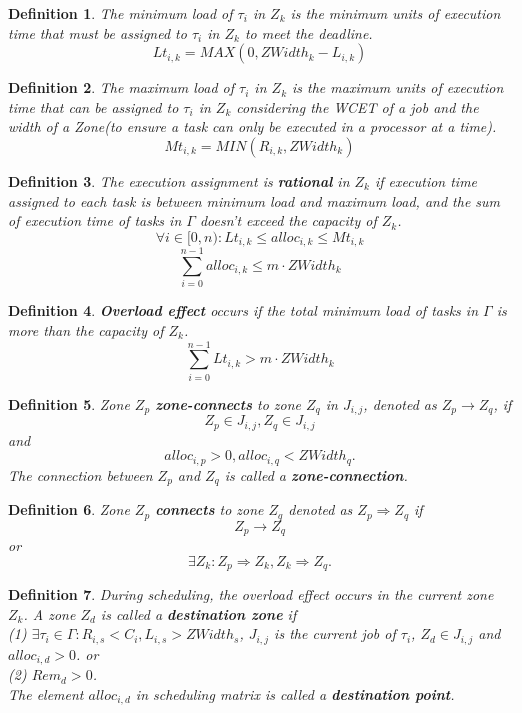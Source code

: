 \documentclass{article}
\begin{document}
\newtheorem{defi}{Definition}
\newtheorem{lemm}{Lemma}

\begin{defi}
The minimum load of $\tau_i$ in $Z_k$ is the minimum units of execution time that must be assigned to $\tau_i$ in $Z_k$ to meet the deadline.
\[
	Lt_{i,k}=MAX(0,ZWidth_k-L_{i,k})
\]
\end{defi}

\begin{defi}
The maximum load of $\tau_i$ in $Z_k$ is the maximum units of execution time that can be assigned to $\tau_i$ in $Z_k$ considering the WCET of a job and the width of a Zone(to ensure a task can only be executed in a processor at a time).
\[
	Mt_{i,k}=MIN(R_{i,k}, ZWidth_k)
\]
\end{defi}

\begin{defi}
The execution assignment is \textbf{rational} in $Z_k$ if execution time assigned to each task is between minimum load and maximum load, and the sum of execution time of tasks in $\Gamma$ doesn't exceed the capacity of $Z_k$.
\[
	\forall i \in [0,n) : Lt_{i,k} \leq alloc_{i,k} \leq Mt_{i,k}
\]
\[
	\sum\limits_{i=0}^{n-1}alloc_{i,k} \leq m \cdot ZWidth_k
\]
\end{defi}

\begin{defi}
\textbf{Overload effect} occurs if the total minimum load of tasks in $\Gamma$ is more than the capacity of $Z_k$.
\[
	\sum\limits_{i=0}^{n-1}Lt_{i,k} > m \cdot ZWidth_k
\]
\end{defi}

\begin{defi}
Zone $Z_p$ \textbf{zone-connects} to zone $Z_q$ in $J_{i,j}$, denoted as $Z_p \to Z_q$, if
\[
	Z_p \in J_{i,j}, Z_q \in J_{i,j}
\]
and
\[
	alloc_{i,p}>0, alloc_{i,q}<ZWidth_q.
\]
The connection between $Z_p$ and $Z_q$ is called a \textbf{zone-connection}.
\end{defi}

\begin{defi}
	Zone $Z_p$ \textbf{connects} to zone $Z_q$ denoted as $Z_p \Rightarrow Z_q$ if
	\[
		Z_p \to Z_q
	\]
	or
	\[
		\exists Z_k : Z_p \Rightarrow Z_k, Z_k \Rightarrow Z_q.
	\]
\end{defi}

\begin{defi}
	During scheduling, the overload effect occurs in the current zone $Z_k$. A zone $Z_d$ is called a \textbf{destination zone} if \\
	(1) $\exists \tau_i \in \Gamma : R_{i,s} < C_i, L_{i,s} > ZWidth_s$, $J_{i,j}$ is the current job of $\tau_i$, $Z_d \in J_{i,j}$ and $alloc_{i,d}>0$. or\\
	(2) $Rem_d > 0$. \\ 
	The element $alloc_{i,d}$ in scheduling matrix is called a \textbf{destination point}.
\end{defi}
\end{document}
